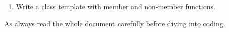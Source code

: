 
\objectives
{
    \begin{enumerate}
        \item Write a class template with member and non-member functions.
    \end{enumerate}
}

As always read the whole document carefully before diving into coding.


